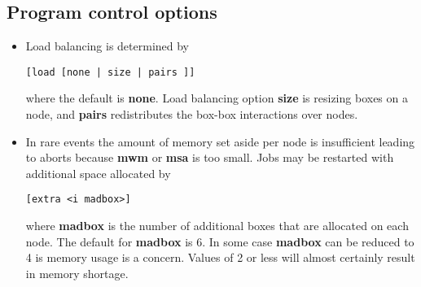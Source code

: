 \subsection{Program control options}
\begin{itemize}
\item
Load balancing is determined by
\begin{verbatim}
[load [none | size | pairs ]]
\end{verbatim}
where the default is {\bf none}. Load balancing option {\bf size}
is resizing boxes on a node, and {\bf pairs} redistributes the
box-box interactions over nodes.
\item
In rare events the amount of memory set aside per node is insufficient
leading to aborts because {\bf mwm} or {\bf msa} is too small. Jobs
may be restarted with additional space allocated by
\begin{verbatim}
[extra <i madbox>]
\end{verbatim}
where {\bf madbox} is the number of additional boxes that are allocated
on each node. The default for {\bf madbox} is 6. In some case {\bf madbox}
can be reduced to 4 is memory usage is a concern. Values of 2 or less
will almost certainly result in memory shortage.
\end{itemize}
